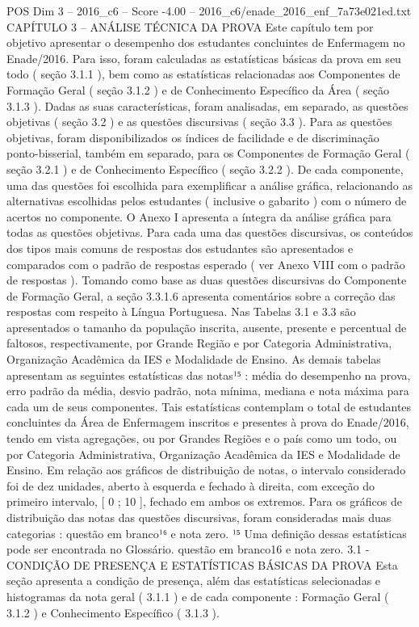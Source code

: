 \begin{textsample}{POS Dim 3 – 2016\_c6 – Score -4.00 – 2016\_c6/enade\_2016\_enf\_7a73e021ed.txt}  \label{ex:f3_pos_246}
CAPÍTULO 3 – ANÁLISE TÉCNICA DA PROVA Este capítulo tem por objetivo apresentar o desempenho dos estudantes concluintes de Enfermagem no Enade/2016.
Para isso, foram calculadas as estatísticas básicas da prova em seu todo ( seção 3.1.1 ), bem como as estatísticas relacionadas aos Componentes de Formação Geral ( seção 3.1.2 ) e de Conhecimento Específico da Área ( seção 3.1.3 ).
Dadas as suas características, foram analisadas, em separado, as questões objetivas ( seção 3.2 ) e as questões discursivas ( seção 3.3 ).
Para as questões objetivas, foram disponibilizados os índices de facilidade e de discriminação ponto-bisserial, também em separado, para os Componentes de Formação Geral ( seção 3.2.1 ) e de Conhecimento Específico ( seção 3.2.2 ).
De cada componente, uma das questões foi escolhida para exemplificar a análise gráfica, relacionando as alternativas escolhidas pelos estudantes ( inclusive o gabarito ) com o número de acertos no componente.
O Anexo I apresenta a íntegra da análise gráfica para todas as questões objetivas.
Para cada uma das questões discursivas, os conteúdos dos tipos mais comuns de respostas dos estudantes são apresentados e comparados com o padrão de respostas esperado ( ver Anexo VIII com o padrão de respostas ).
Tomando como base as duas questões discursivas do Componente de Formação Geral, a seção 3.3.1.6 apresenta comentários sobre a correção das respostas com respeito à Língua Portuguesa.
Nas Tabelas 3.1 e 3.3 são apresentados o tamanho da população inscrita, ausente, presente e percentual de faltosos, respectivamente, por Grande Região e por Categoria Administrativa, Organização Acadêmica da IES e Modalidade de Ensino.
As demais tabelas apresentam as seguintes estatísticas das notas¹⁵ : média do desempenho na prova, erro padrão da média, desvio padrão, nota mínima, mediana e nota máxima para cada um de seus componentes.
Tais estatísticas contemplam o total de estudantes concluintes da Área de Enfermagem inscritos e presentes à prova do Enade/2016, tendo em vista agregações, ou por Grandes Regiões e o país como um todo, ou por Categoria Administrativa, Organização Acadêmica da IES e Modalidade de Ensino.
Em relação aos gráficos de distribuição de notas, o intervalo considerado foi de dez unidades, aberto à esquerda e fechado à direita, com exceção do primeiro intervalo, [ 0 ; 10 ], fechado em ambos os extremos.
Para os gráficos de distribuição das notas das questões discursivas, foram consideradas mais duas categorias : questão em branco¹⁶ e nota zero. ¹⁵ Uma definição dessas estatísticas pode ser encontrada no Glossário. questão em branco16 e nota zero. 3.1 - CONDIÇÃO DE PRESENÇA E ESTATÍSTICAS BÁSICAS DA PROVA Esta seção apresenta a condição de presença, além das estatísticas selecionadas e histogramas da nota geral ( 3.1.1 ) e de cada componente : Formação Geral ( 3.1.2 ) e Conhecimento Específico ( 3.1.3 ).

\end{textsample}
